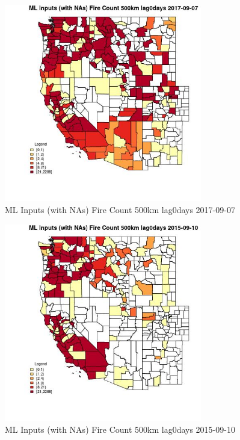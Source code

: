 \begin{figure} 
\centering  
\includegraphics[width=0.77\textwidth]{Code_Outputs/Report_ML_input_PM25_Step4_part_e_de_duplicated_aves_compiled_2019-05-21wNAs_CountyFire_Count_500km_lag0daysMean2017-09-07.jpg} 
\caption{\label{fig:Report_ML_input_PM25_Step4_part_e_de_duplicated_aves_compiled_2019-05-21wNAsCountyFire_Count_500km_lag0daysMean2017-09-07}ML Inputs (with NAs) Fire Count 500km lag0days 2017-09-07} 
\end{figure} 
 

\begin{figure} 
\centering  
\includegraphics[width=0.77\textwidth]{Code_Outputs/Report_ML_input_PM25_Step4_part_e_de_duplicated_aves_compiled_2019-05-21wNAs_CountyFire_Count_500km_lag0daysMean2015-09-10.jpg} 
\caption{\label{fig:Report_ML_input_PM25_Step4_part_e_de_duplicated_aves_compiled_2019-05-21wNAsCountyFire_Count_500km_lag0daysMean2015-09-10}ML Inputs (with NAs) Fire Count 500km lag0days 2015-09-10} 
\end{figure} 
 

